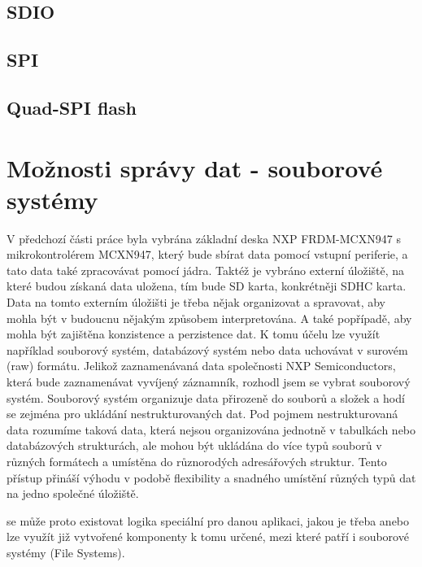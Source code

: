 \subsection{SDIO}

\subsection{SPI}

\subsection{Quad-SPI flash}


\section{Možnosti správy dat - souborové systémy}
V předchozí části práce byla vybrána základní deska NXP FRDM-MCXN947 s mikrokontrolérem MCXN947, který bude sbírat data pomocí vstupní periferie, a tato data také zpracovávat pomocí jádra. Taktéž je vybráno externí úložiště, na které budou získaná data uložena, tím bude SD karta, konkrétněji SDHC karta. Data na tomto externím úložišti je třeba nějak organizovat a spravovat, aby mohla být v budoucnu nějakým způsobem interpretována. A také popřípadě, aby mohla být zajištěna konzistence a perzistence dat. K tomu účelu lze využít například souborový systém, databázový systém nebo data uchovávat v surovém (raw) formátu. Jelikož zaznamenávaná data společnosti NXP Semiconductors, která bude zaznamenávat vyvíjený záznamník, rozhodl jsem se vybrat souborový systém. Souborový systém organizuje data přirozeně do souborů a složek a hodí se zejména pro ukládání nestrukturovaných dat. Pod pojmem nestrukturovaná data rozumíme taková data, která nejsou organizována jednotně v tabulkách nebo databázových strukturách, ale mohou být ukládána do více typů souborů v různých formátech a umístěna do různorodých adresářových struktur. Tento přístup přináší výhodu v podobě flexibility a snadného umístění různých typů dat na jedno společné úložiště. \cite{weka_structured_unstructured_data, virginia_tech_file_database_systems}

se  může proto existovat logika speciální pro danou aplikaci, jakou je třeba anebo lze využít již vytvořené komponenty k tomu určené, mezi které patří i souborové systémy (File Systems).

